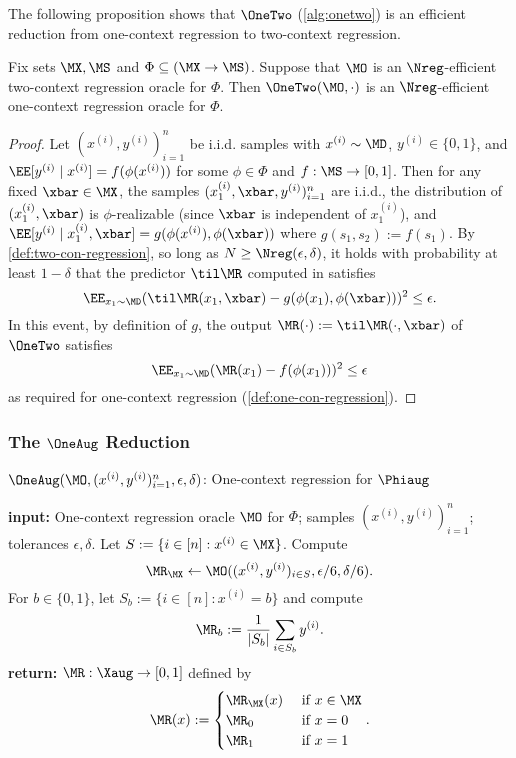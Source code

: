 The following proposition shows that $\OneTwo$ (\cref{alg:onetwo}) is an efficient reduction from one-context regression to two-context regression.

\begin{proposition}\label{prop:onetwo}
Fix sets $\MX,\MS$ and $\Phi \subseteq (\MX\to\MS)$. Suppose that $\MO$ is an $\Nreg$-efficient two-context regression oracle for $\Phi$. Then $\OneTwo(\MO,\cdot)$ is an $\Nreg$-efficient one-context regression oracle for $\Phi$.
\end{proposition}

\begin{proof}
Let $(x^{(i)},y^{(i)})_{i=1}^n$ be i.i.d. samples with $x^{(i)} \sim \MD$, $y^{(i)} \in \{0,1\}$, and $\EE[y^{(i)}\mid{}x^{(i)}] = f(\phi(x^{(i)}))$ for some $\phi \in\Phi$ and $f:\MS\to[0,1]$. Then for any fixed $\xbar \in \MX$, the samples $(x_1^{(i)},\xbar,y^{(i)})_{i=1}^n$ are i.i.d., the distribution of $(x_1^{(i)},\xbar)$ is $\phi$-realizable (since $\xbar$ is independent of $x_1^{(i)}$), and $\EE[y^{(i)}\mid{}x_1^{(i)},\xbar] = g(\phi(x^{(i)}),\phi(\xbar))$ where $g(s_1,s_2) := f(s_1)$. By \cref{def:two-con-regression}, so long as $N \geq \Nreg(\epsilon,\delta)$, it holds with probability at least $1-\delta$ that the predictor $\til \MR$ computed in  satisfies
\[\EE_{x_1 \sim \MD} (\til\MR(x_1,\xbar) - g(\phi(x_1), \phi(\xbar)))^2 \leq \epsilon.\]
In this event, by definition of $g$, the output $\MR(\cdot) := \til\MR(\cdot,\xbar)$ of $\OneTwo$ satisfies
\[\EE_{x_1 \sim \MD} (\MR(x_1) - f(\phi(x_1)))^2 \leq \epsilon\]
as required for one-context regression (\cref{def:one-con-regression}).
\end{proof}

\subsubsection{The $\OneAug$ Reduction}\label{sec:oneaug}

\begin{algorithm}[t]
	\caption{$\OneAug(\MO, (x^{(i)},y^{(i)})_{i=1}^n,\epsilon,\delta)$: One-context regression for $\Phiaug$}
	\label{alg:oneaug}
	\begin{algorithmic}[1]\onehalfspacing
		\State\textbf{input:} One-context regression oracle $\MO$ for $\Phi$; samples $(x^{(i)},y^{(i)})_{i=1}^n$; tolerances $\epsilon,\delta$.
		\State Let $S := \{i \in [n]: x^{(i)} \in \MX\}$.
        \State Compute
        \[\MR_\MX \gets \MO((x^{(i)}, y^{(i)})_{i \in S},\epsilon/6, \delta/6).\]\label{line:mrmx}
        \State For $b \in \{0,1\}$, let $S_b := \{i \in [n]: x^{(i)} = b\}$ and compute
        \[\MR_b := \frac{1}{|S_b|} \sum_{i \in S_b} y^{(i)}.\]\label{line:mrb}
        \State \textbf{return:} $\MR:\Xaug\to[0,1]$ defined by \[ \MR(x) := 
        \begin{cases} 
        \MR_\MX(x) & \text{ if } x \in \MX \\ 
        \MR_0 & \text{ if } x = 0 \\ 
        \MR_1 & \text{ if } x = 1
        \end{cases}.\]
	\end{algorithmic}
\end{algorithm}


